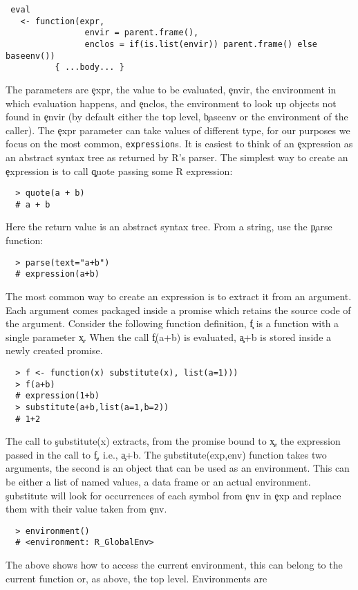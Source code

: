 \documentclass[USenglish,cleveref, autoref, thm-restate]{lipics-v2019}
\begin{document}
\begin{lstlisting}
 eval
   <- function(expr,
                envir = parent.frame(),
                enclos = if(is.list(envir)) parent.frame() else baseenv())
          { ...body... }
\end{lstlisting}
The parameters are \c{expr}, the value to be evaluated, \c{envir}, the
environment in which evaluation happens, and \c{enclos}, the
environment to look up objects not found in \c{envir} (by default
either the top level, \c{baseenv} or the environment of the caller).
The \c{expr} parameter can take values of different type, for our
purposes we focus on the most common, {\tt expression}s. It is easiest
to think of an \c{expression} as an abstract syntax tree as returned
by R's parser. The simplest way to create an \c{expression} is to call
\c{quote} passing some R expression:
\begin{lstlisting}
  > quote(a + b)
  # a + b
\end{lstlisting}
Here the return value is an abstract syntax tree. From a
string, use  the \c{parse} function:
\begin{lstlisting}
  > parse(text="a+b")
  # expression(a+b)
\end{lstlisting}
The most common way to create an expression is to extract it from an
argument. Each argument comes packaged inside a promise which retains
the source code of the argument. Consider the following function
definition, \c{f} is a function with a single parameter \c{x}. When
the call \c{f(a+b)} is evaluated, \c{a+b} is stored inside a newly
created promise.
\begin{lstlisting}
  > f <- function(x) substitute(x), list(a=1)))
  > f(a+b)
  # expression(1+b)
  > substitute(a+b,list(a=1,b=2))
  # 1+2
\end{lstlisting}
The call to \c{substitute(x)} extracts, from the promise bound to
\c{x}, the expression passed in the call to \c{f}, i.e., \c{a+b}. The
\c{substitute(exp,env)} function takes two arguments, the second is an
object that can be used as an environment. This can be either a list
of named values, a data frame or an actual environment. \c{substitute}
will look for occurrences of each symbol from \c{env} in \c{exp} and
replace them with their value taken from \c{env}.
\begin{lstlisting}
  > environment()
  # <environment: R_GlobalEnv>
\end{lstlisting}
The above shows how to access the current environment, this can belong
to the current function or, as above, the top level. Environments are
\end{document}
